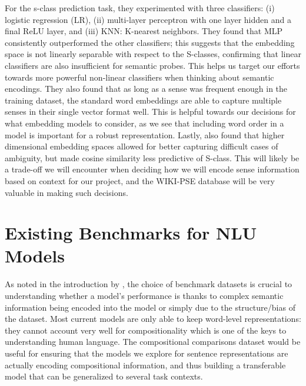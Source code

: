 \documentclass[11pt,a4paper]{article}
\begin{document}
For the s-class prediction task, they experimented with three classifiers: (i) logistic regression (LR), (ii) multi-layer perceptron with one layer hidden and a final ReLU layer, and (iii) KNN: K-nearest neighbors. They found that MLP consistently outperformed the other classifiers; this suggests that the embedding space is not linearly separable with respect to the S-classes, confirming that linear classifiers are also insufficient for semantic probes. This helps us target our efforts towards more powerful non-linear classifiers when thinking about semantic encodings. They also found that as long as a sense was frequent enough in the training dataset, the standard word embeddings are able to capture multiple senses in their single vector format well. This is helpful towards our decisions for what embedding models to consider, as we see that including word order in a model is important for a robust representation. Lastly, \cite{yaghoob2019probing} also found that higher dimensional embedding spaces allowed for better capturing difficult cases of ambiguity, but made cosine similarity less predictive of S-class. This will likely be a trade-off we will encounter when deciding how we will encode sense information based on context for our project, and the WIKI-PSE database will be very valuable in making such decisions.


\section{Existing Benchmarks for NLU Models}
As noted in the introduction by \cite{dasgupta2018comp}, the choice of benchmark datasets is crucial to understanding whether a model's performance is thanks to complex semantic information being encoded into the model or simply due to the structure/bias of the dataset. Most current models are only able to keep word-level representations: they cannot account very well for compositionality which is one of the keys to understanding human language. The compositional comparisons dataset would be useful for ensuring that the models we explore for sentence representations are actually encoding compositional information, and thus building a transferable model that can be generalized to several task contexts.
\end{document}
